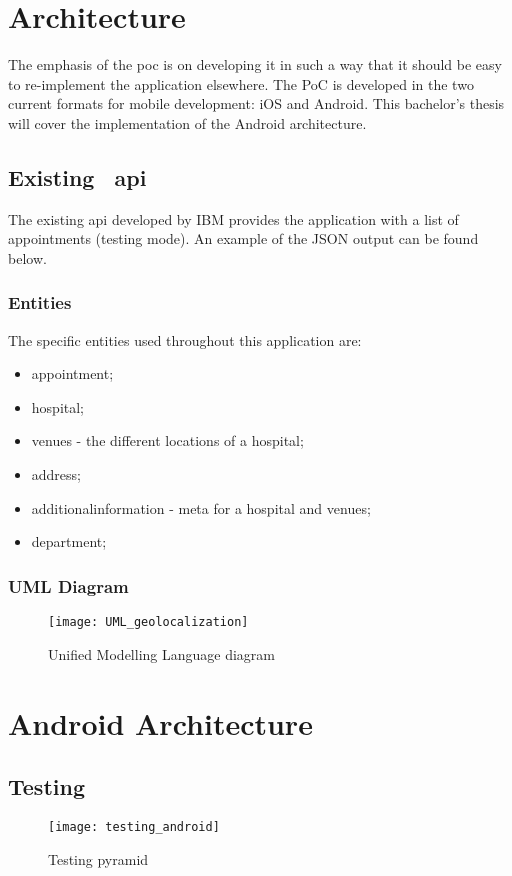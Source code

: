 \section{Architecture}
The emphasis of the \acrshort{poc} is on developing it in such a way that it should be easy to re-implement the application elsewhere. The PoC is developed in the two current formats for mobile development: iOS and Android. This bachelor's thesis will cover the implementation of the Android architecture.
\subsection{Existing ~\acrshort{api}}
The existing \acrshort{api} developed by IBM provides the application with a list of appointments (testing mode). An example of the JSON output can be found below.						
\subsubsection{Entities}
The specific entities used throughout this application are:
\begin{itemize}
\item appointment;
\item hospital;
\item venues - the different locations of a hospital;
\item address;
\item additionalinformation - meta for a hospital and venues;
\item department;
\end{itemize}
\subsubsection{UML Diagram}
\begin{landscape}
\begin{figure}[!h]
\centering
\texttt{[image: UML\_geolocalization]}
\caption{Unified Modelling Language diagram}
\end{figure}
\end{landscape}
\section{Android Architecture}
\subsection{Testing}
\cite{Google_testing2017}
\begin{figure}[h!]
\texttt{[image: testing\_android]}
\centering
\caption{Testing pyramid~\cite{FernandoSproviero2018}}
\end{figure}
